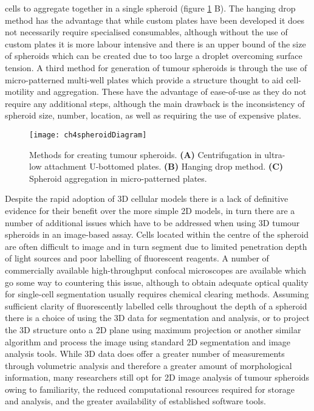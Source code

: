 \documentclass[a4paper,11pt,twoside,openright]{scrbook}
\begin{document}
cells to aggregate together in a single spheroid \cite{Kelm2003} (figure \ref{figure:spheroid_diagram} B).
The hanging drop method has the advantage that while custom plates have been developed it does not necessarily require 
specialised consumables, although without the use of custom plates it is more labour intensive and there is an upper 
bound of the size of spheroids which can be created due to too large a droplet overcoming surface tension.
A third method for generation of tumour spheroids is through the use of micro-patterned multi-well plates which provide 
a structure thought to aid cell-motility and aggregation.
These have the advantage of ease-of-use as they do not require any additional steps, although the main drawback is the 
inconsistency of spheroid size, number, location, as well as requiring the use of expensive plates.

\begin{figure}[h]
    \captionsetup{width=0.8\textwidth}
        \caption[Methods for creating tumour spheroids]{
            Methods for creating tumour spheroids.
            \textbf{(A)} Centrifugation in ultra-low attachment U-bottomed plates.
            \textbf{(B)} Hanging drop method.
            \textbf{(C)} Spheroid aggregation in micro-patterned plates.
        }
        \texttt{[image: ch4spheroidDiagram]}
    \label{figure:spheroid_diagram}
\end{figure}

Despite the rapid adoption of 3D cellular models there is a lack of definitive evidence for their benefit over the more 
simple 2D models, in turn there are a number of additional issues which have to be addressed when using 3D tumour 
spheroids in an image-based assay.
Cells located within the centre of the spheroid are often difficult to image and in turn segment due to limited 
penetration depth of light sources and poor labelling of fluorescent reagents.
A number of commercially available high-throughput confocal microscopes are available which go some way to countering 
this issue, although to obtain adequate optical quality for single-cell segmentation usually requires chemical clearing 
methods.
Assuming sufficient clarity of fluorescently labelled cells throughout the depth of a spheroid there is a choice of 
using the 3D data for segmentation and analysis, or to project the 3D structure onto a 2D plane using maximum 
projection or another similar algorithm and process the image using standard 2D segmentation and image analysis tools.
While 3D data does offer a greater number of measurements through volumetric analysis and therefore a greater amount of 
morphological information, many researchers still opt for 2D image analysis of tumour spheroids owing to familiarity, 
the reduced computational resources required for storage and analysis, and the greater availability of established 
software tools.
\end{document}
